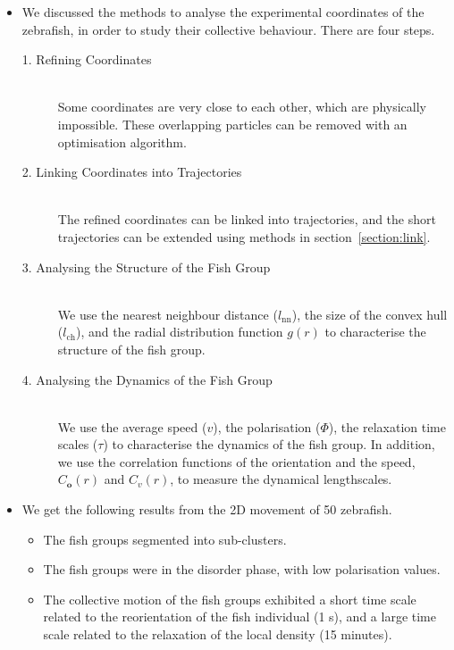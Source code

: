 \documentclass[11pt,twoside]{report}
\begin{document}
\vfill
\pagebreak

\begin{adjustwidth}{-5cm}{0cm}
\begin{tcolorbox}[
fonttitle=\sffamily\Large,
right=0.05\linewidth,
title=Summary of Chapter~5
]
\begin{itemize}
	\item We discussed the methods to analyse the experimental coordinates of the zebrafish, in order to study their collective behaviour. There are four steps.
	\begin{description}
		\item[1. Refining Coordinates] \hfill \\
		Some coordinates are very close to each other, which are physically impossible. These overlapping particles can be removed with an optimisation algorithm.
		\item[2. Linking Coordinates into Trajectories] \hfill \\
		The refined coordinates can be linked into trajectories, and the short trajectories can be extended using methods in section~\ref{section:link}.
		\item[3. Analysing the Structure of the Fish Group] \hfill \\
		We use the nearest neighbour distance ($l_\mathrm{nn}$), the size of the convex hull ($l_\mathrm{ch}$), and the radial distribution function $g(r)$ to characterise the structure of the fish group.
		\item[4. Analysing the Dynamics of the Fish Group] \hfill \\
		We use the average speed ($v$), the polarisation ($\Phi$), the relaxation time scales ($\tau$) to characterise the dynamics of the fish group.
		In addition, we use the correlation functions of the orientation and the speed, $C_\mathbf{o}(r)$ and $C_v(r)$, to measure the dynamical lengthscales.
		\end{description}
	\item We get the following results from the 2D movement of 50 zebrafish.
	\begin{itemize}
		\item The fish groups segmented into sub-clusters.
		\item The fish groups were in the disorder phase, with low polarisation values.
		\item The collective motion of the fish groups exhibited a short time scale related to the reorientation of the fish individual (1 s), and a large time scale related to the relaxation of the local density (15 minutes).

\end{itemize}
\end{itemize}
\end{tcolorbox}
\end{adjustwidth}
\end{document}
